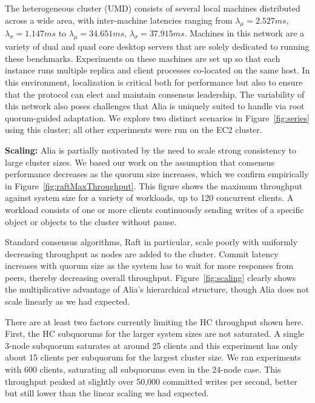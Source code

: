 \documentclass[letterpaper,10pt,twocolumn]{article}
\newcommand{\sub}{subquorum\xspace}
\newcommand{\subs}{subquorums\xspace}
\newcommand{\sys}{Alia\xspace}
\newcommand{\roo}{root quorum\xspace}
\newcommand{\para}[1]{\vspace{.04in}\noindent\textbf{#1}}
\begin{document}
The heterogeneous cluster (UMD) consists of several local machines distributed
across a wide area, with inter-machine latencies ranging from
$\lambda_{\mu}=2.527ms$,
$\lambda_{\sigma}=1.147ms$ to $\lambda_{\mu}=34.651ms$,
$\lambda_{\sigma}=37.915ms$.
Machines in this network are a variety of dual and quad core desktop servers
that are solely dedicated to running these benchmarks.
Experiments on these machines are set up so that each instance runs multiple
replica and client processes co-located on the same host.
In this environment, localization is critical both for performance but also
to ensure that the protocol can elect and maintain consensus leadership.
The variability of this network also poses challenges that \sys is uniquely
suited to handle via \roo-guided adaptation.
We explore two distinct scenarios in Figure~\ref{fig:series} using
this cluster; all other experiments were run on the EC2 cluster.

\para{Scaling:} \sys is partially motivated by the need to scale strong
consistency to large cluster sizes.
We based our work on the assumption that consensus performance decreases as
the quorum size increases, which we confirm empirically in
Figure~\ref{fig:raftMaxThroughput}.
This figure shows the maximum throughput against system size for a
variety of workloads, up to 120 concurrent clients.
A workload consists of one or more clients continuously sending writes of a
specific object or objects to the cluster without pause.

Standard consensus algorithms, Raft in particular, scale poorly with
uniformly decreasing throughput as nodes are added to the cluster.
Commit latency increases with quorum size as the system has
to wait for more responses from peers, thereby decreasing overall throughput.
Figure~\ref{fig:scaling} clearly shows the multiplicative advantage of \sys's
hierarchical structure, though \sys does not scale linearly as we had
expected.

There are at least two factors currently limiting the HC throughput shown
here.
First, the HC \subs for the larger system sizes are not saturated.
A single 3-node \sub saturates at around 25 clients and this experiment has
only about 15 clients per \sub for the largest cluster size.
We ran experiments with 600 clients, saturating all \subs even in the 24-node
case.
This throughput peaked at slightly over 50,000 committed writes per second,
better but still lower than the linear scaling we had expected.
\end{document}
